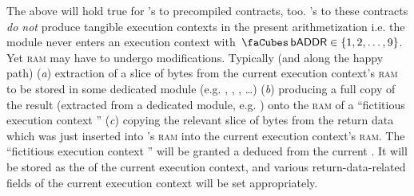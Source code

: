 \saNote{} The above will hold true for 's to precompiled contracts, too. 's to these contracts \emph{do not} produce tangible execution contexts in the present arithmetization i.e. the \hubMod{} module never enters an execution context with $\cnCodeAddress \in \{ 1, 2, \dots, 9 \}$. Yet \textsc{ram} may have to undergo modifications. Typically (and along the happy path)
(\emph{a})
extraction of a slice of bytes from the current execution context's \textsc{ram} to be stored in some dedicated  module (e.g.
\ecDataMod{},
\hashDataMod{},
\romMod{},
\dots{})
(\emph{b})
producing a full copy of the result (extracted from a dedicated  module, e.g. \hashInfoMod{}) onto the \textsc{ram} of a ``fictitious execution context ''
(\emph{c})
copying the relevant slice of bytes from the return data which was just inserted into 's \textsc{ram} into the current execution context's \textsc{ram}. The ``fictitious execution context '' will be granted a \cn{} deduced from the current \hubStamp{}. It will be stored as the \cnReturner{} of the current execution context, and various return-data-related fields of the current execution context will be set appropriately. 
